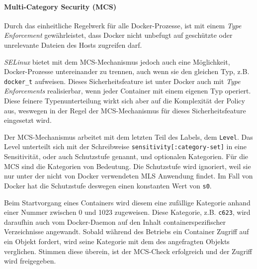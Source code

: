 \documentclass[../main.tex]{subfiles}
\begin{document}
				\paragraph{Multi-Category Security (MCS)}
					Durch das einheitliche Regelwerk für alle Docker-Prozesse, ist mit einem \emph{Type Enforcement} gewährleistet, dass Docker nicht unbefugt auf geschützte oder unrelevante Dateien des Hosts zugreifen darf.

					\emph{SELinux} bietet mit dem MCS-Mechanismus jedoch auch eine Möglichkeit, Docker-Prozesse untereinander zu trennen, auch wenn sie den gleichen Typ, z.B. \texttt{docker\_t} aufweisen. Dieses Sicherheitsfeature ist unter Docker auch mit \emph{Type Enforcements} realisierbar, wenn jeder Container mit einem eigenen Typ operiert. Diese feinere Typenunterteilung wirkt sich aber auf die Komplexität der Policy aus, weswegen in der Regel der MCS-Mechanismus für dieses Sicherheitsfeature eingesetzt wird.

					Der MCS-Mechanismus arbeitet mit dem letzten Teil des Labels, dem \texttt{Level}. Das Level unterteilt sich mit der Schreibweise \texttt{sensitivity[:category-set]} in eine Sensitivität, oder auch Schutzstufe genannt, und optionalen Kategorien. Für die MCS sind die Kategorien von Bedeutung. Die Schutzstufe wird ignoriert, weil sie nur unter der nicht von Docker verwendeten \acrshort{MLS} Anwendung findet. Im Fall von Docker hat die Schutzstufe deswegen einen konstanten Wert von \texttt{s0}.

					Beim Startvorgang eines Containers wird diesem eine zufällige Kategorie anhand einer Nummer zwischen 0 und 1023 zugeweisen. Diese Kategorie, z.B. \texttt{c623}, wird daraufhin auch vom Docker-Daemon auf den Inhalt containerspezifischer Verzeichnisse angewandt. Sobald während des Betriebs ein Container Zugriff auf ein Objekt fordert, wird seine Kategorie mit dem des angefragten Objekts verglichen. Stimmen diese überein, ist der MCS-Check erfolgreich und der Zugriff wird freigegeben.
\end{document}
